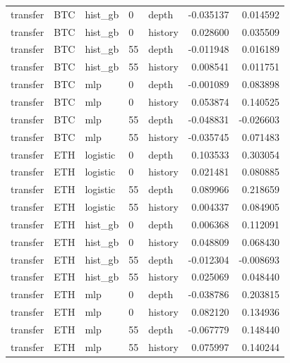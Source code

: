 \begin{longtable}{lllllrr}
transfer & BTC & hist\_gb & 0 & depth & -0.035137 & 0.014592 \\
transfer & BTC & hist\_gb & 0 & history & 0.028600 & 0.035509 \\
transfer & BTC & hist\_gb & 55 & depth & -0.011948 & 0.016189 \\
transfer & BTC & hist\_gb & 55 & history & 0.008541 & 0.011751 \\
transfer & BTC & mlp & 0 & depth & -0.001089 & 0.083898 \\
transfer & BTC & mlp & 0 & history & 0.053874 & 0.140525 \\
transfer & BTC & mlp & 55 & depth & -0.048831 & -0.026603 \\
transfer & BTC & mlp & 55 & history & -0.035745 & 0.071483 \\
transfer & ETH & logistic & 0 & depth & 0.103533 & 0.303054 \\
transfer & ETH & logistic & 0 & history & 0.021481 & 0.080885 \\
transfer & ETH & logistic & 55 & depth & 0.089966 & 0.218659 \\
transfer & ETH & logistic & 55 & history & 0.004337 & 0.084905 \\
transfer & ETH & hist\_gb & 0 & depth & 0.006368 & 0.112091 \\
transfer & ETH & hist\_gb & 0 & history & 0.048809 & 0.068430 \\
transfer & ETH & hist\_gb & 55 & depth & -0.012304 & -0.008693 \\
transfer & ETH & hist\_gb & 55 & history & 0.025069 & 0.048440 \\
transfer & ETH & mlp & 0 & depth & -0.038786 & 0.203815 \\
transfer & ETH & mlp & 0 & history & 0.082120 & 0.134936 \\
transfer & ETH & mlp & 55 & depth & -0.067779 & 0.148440 \\
transfer & ETH & mlp & 55 & history & 0.075997 & 0.140244 \\
\end{longtable}
